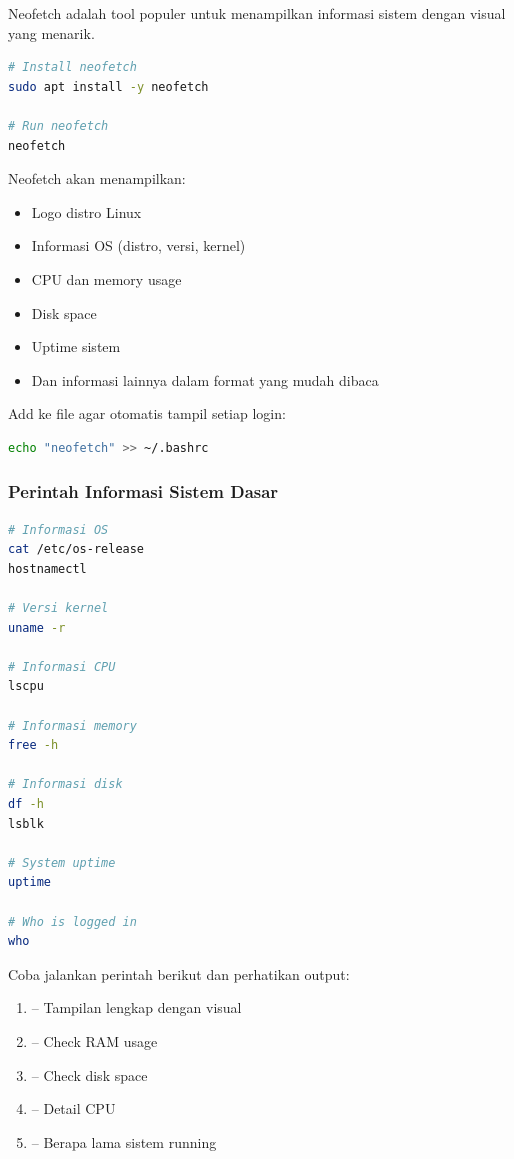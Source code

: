 Neofetch adalah tool populer untuk menampilkan informasi sistem dengan visual yang menarik.

\begin{lstlisting}[language=bash, caption={Install neofetch}]
# Install neofetch
sudo apt install -y neofetch

# Run neofetch
neofetch
\end{lstlisting}

Neofetch akan menampilkan:
\begin{itemize}
    \item Logo distro Linux
    \item Informasi OS (distro, versi, kernel)
    \item CPU dan memory usage
    \item Disk space
    \item Uptime sistem
    \item Dan informasi lainnya dalam format yang mudah dibaca
\end{itemize}

\begin{tipbox}
Add  ke file  agar otomatis tampil setiap login:
\begin{lstlisting}[language=bash]
echo "neofetch" >> ~/.bashrc
\end{lstlisting}
\end{tipbox}

\subsubsection{Perintah Informasi Sistem Dasar}

\begin{lstlisting}[language=bash, caption={Perintah informasi sistem dasar}]
# Informasi OS
cat /etc/os-release
hostnamectl

# Versi kernel
uname -r

# Informasi CPU
lscpu

# Informasi memory
free -h

# Informasi disk
df -h
lsblk

# System uptime
uptime

# Who is logged in
who
\end{lstlisting}

\begin{examplebox}
Coba jalankan perintah berikut dan perhatikan output:
\begin{enumerate}
    \item {} -- Tampilan lengkap dengan visual
    \item {} -- Check RAM usage
    \item {} -- Check disk space
    \item {} -- Detail CPU
    \item {} -- Berapa lama sistem running
\end{enumerate}
\end{examplebox}

